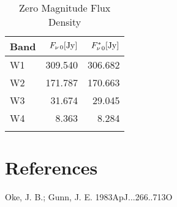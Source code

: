 \documentclass[11pt,a4paper]{article}
\begin{document}
\begin{table}
  \begin{center}
    \setlength{\tabcolsep}{4pt}
    \begin{tabular}{lrr}
      \hline\hline
      Band  & $F_{\nu\,0} [\rm{Jy}]$ & $F^{*}_{\nu\,0} [\rm{Jy}]$\\
      \hline
      W1 & 309.540 & 306.682 \\
      W2 & 171.787 & 170.663 \\
      W3 &  31.674  &   29.045 \\
      W4 &    8.363  &    8.284 \\
      \hline\hline
      \label{tab:WISE_ZMFD}
    \end{tabular}
    \caption{Zero Magnitude Flux Density}
  \end{center}
\end{table}

\section*{References}
Oke, J. B.; Gunn, J. E. 1983ApJ...266..713O\\
\end{document}
